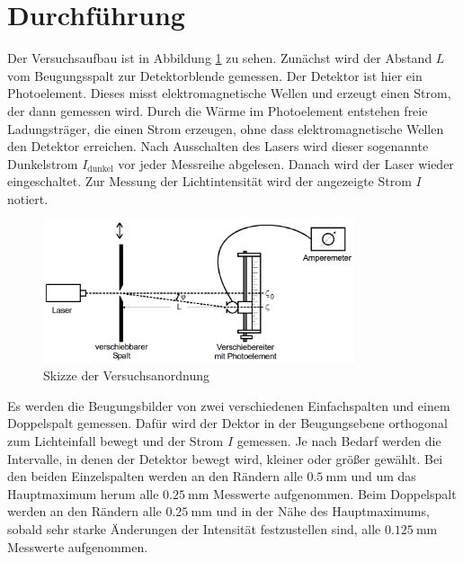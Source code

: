 \section{Durchführung}
\label{sec:Durchführung}

Der Versuchsaufbau ist in Abbildung \ref{fig:aufbau} zu sehen. Zunächst wird der Abstand $L$
vom Beugungsspalt zur Detektorblende gemessen. Der Detektor ist hier ein Photoelement.
Dieses misst elektromagnetische Wellen und erzeugt einen Strom, der dann gemessen wird.
Durch die Wärme im Photoelement entstehen freie Ladungsträger, die einen Strom erzeugen,
ohne dass elektromagnetische Wellen den Detektor erreichen. Nach Ausschalten des Lasers
wird dieser sogenannte Dunkelstrom $I_\text{dunkel}$ vor jeder Messreihe abgelesen.
Danach wird der Laser wieder eingeschaltet. Zur Messung der Lichtintensität wird der
angezeigte Strom $I$ notiert.

\begin{figure}
  \centering
  \includegraphics[width=260pt]{data/aufbau.png}
  \caption{Skizze der Versuchsanordnung \cite{Versuchsanleitung}}
  \label{fig:aufbau}
\end{figure}

Es werden die Beugungsbilder von zwei verschiedenen Einfachspalten und einem Doppelspalt
gemessen. Dafür wird der Dektor in der Beugungsebene orthogonal zum Lichteinfall
bewegt und der Strom $I$ gemessen. Je nach Bedarf werden die Intervalle, in denen der
Detektor bewegt wird, kleiner oder größer gewählt. Bei den beiden Einzelspalten
werden an den Rändern alle $\SI{0.5}{\milli\meter}$ und um das Hauptmaximum herum alle
$\SI{0.25}{\milli\meter}$ Messwerte aufgenommen. Beim Doppelspalt werden an den Rändern
alle $\SI{0.25}{\milli\meter}$ und in der Nähe des Hauptmaximums, sobald sehr starke
Änderungen der Intensität festzustellen sind, alle $\SI{0.125}{\milli\meter}$
Messwerte aufgenommen.
